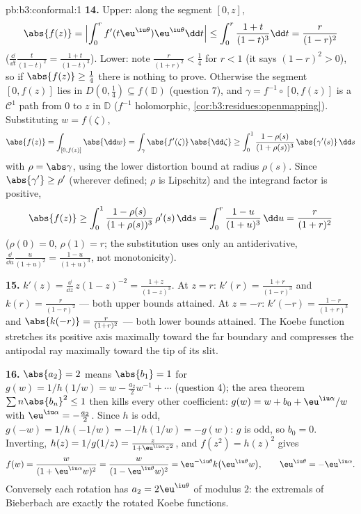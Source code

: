 \begin{solution}{pb:b3:conformal:1}
\textbf{14.} Upper: along the segment $[0, z]$,
\[
\abs{f(z)} = \Bigl|\int_0^rf'(t\eu^{\iu\theta})
\eu^{\iu\theta}\dd t\Bigr|
\leq \int_0^r\frac{1+t}{(1-t)^3}\dd t
= \frac{r}{(1-r)^2}
\]
($\frac{\dd}{\dd t}\frac t{(1-t)^2} = \frac{1+t}{(1-t)^3}$).
Lower: note $\frac r{(1+r)^2} < \frac14$ for $r < 1$ (it
says $(1-r)^2 > 0$), so if $\abs{f(z)} \geq \frac14$ there
is nothing to prove. Otherwise the segment $[0, f(z)]$ lies
in $D(0, \frac14) \subseteq f(\mathbb D)$ (question 7), and
$\gamma = f^{-1}\circ[0, f(z)]$ is a $\mathcal C^1$ path
from $0$ to $z$ in $\mathbb D$ ($f^{-1}$ holomorphic,
\cref{cor:b3:residues:openmapping}). Substituting $w =
f(\zeta)$,
\[
\abs{f(z)} = \int_{[0,f(z)]}\abs{\dd w}
= \int_\gamma\abs{f'(\zeta)}\,\abs{\dd\zeta}
\geq \int_0^1\frac{1 - \rho(s)}{(1 + \rho(s))^3}
\,\abs{\gamma'(s)}\,\dd s
\]
with $\rho = \abs\gamma$, using the lower distortion bound
at radius $\rho(s)$. Since $\abs{\gamma'} \geq \rho'$
(wherever defined; $\rho$ is Lipschitz) and the integrand
factor is positive,
\[
\abs{f(z)} \geq \int_0^1
\frac{1 - \rho(s)}{(1 + \rho(s))^3}\,\rho'(s)\,\dd s
= \int_0^{r}\frac{1 - u}{(1 + u)^3}\,\dd u
= \frac{r}{(1 + r)^2}
\]
($\rho(0) = 0$, $\rho(1) = r$; the substitution uses only an
antiderivative, $\frac{\dd}{\dd u}\frac u{(1+u)^2} =
\frac{1-u}{(1+u)^3}$, not monotonicity).

\textbf{15.} $k'(z) = \frac{\dd}{\dd z}\,z(1 - z)^{-2} =
\frac{1 + z}{(1 - z)^3}$. At $z = r$: $k'(r) =
\frac{1+r}{(1-r)^3}$ and $k(r) = \frac r{(1-r)^2}$ --- both
upper bounds attained. At $z = -r$: $k'(-r) =
\frac{1-r}{(1+r)^3}$ and $\abs{k(-r)} = \frac r{(1+r)^2}$
--- both lower bounds attained. The Koebe function stretches
its positive axis maximally toward the far boundary and
compresses the antipodal ray maximally toward the tip of its
slit.

\textbf{16.} $\abs{a_2} = 2$ means $\abs{b_1} = 1$ for $g(w)
= 1/h(1/w) = w - \frac{a_2}2w^{-1} + \cdots$ (question 4);
the area theorem $\sum n\abs{b_n}^2 \leq 1$ then kills every
other coefficient: $g(w) = w + b_0 + \eu^{\iu\alpha}/w$ with
$\eu^{\iu\alpha} = -\frac{a_2}2$. Since $h$ is odd, $g(-w) =
1/h(-1/w) = -1/h(1/w) = -g(w)$: $g$ is odd, so $b_0 = 0$.
Inverting, $h(z) = 1/g(1/z) = \frac{z}{1 +
\eu^{\iu\alpha}z^2}$, and $f(z^2) = h(z)^2$ gives
\[
f(w) = \frac{w}{(1 + \eu^{\iu\alpha}w)^2}
= \frac{w}{(1 - \eu^{\iu\theta}w)^2}
= \eu^{-\iu\theta}k\bigl(\eu^{\iu\theta}w\bigr),
\qquad \eu^{\iu\theta} = -\eu^{\iu\alpha} .
\]
Conversely each rotation has $a_2 = 2\eu^{\iu\theta}$ of
modulus $2$: the extremals of Bieberbach are exactly the
rotated Koebe functions.


\end{solution}
